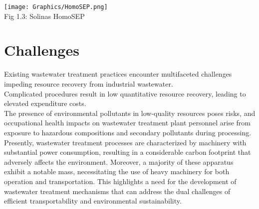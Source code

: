 \documentclass[a4,10pt]{report}
\begin{document}
\begin{center}
    \texttt{[image: Graphics/HomoSEP.png]} \\
    
    Fig 1.3: Solinas HomoSEP \\
\end{center}



\section{Challenges}
Existing wastewater treatment practices encounter multifaceted challenges impeding resource recovery from industrial wastewater. 
\vspace{2mm} \\
Complicated procedures result in low quantitative resource recovery, leading to elevated expenditure costs. \\ 

The presence of environmental pollutants in low-quality resources poses risks, and occupational health impacts on wastewater treatment plant personnel arise from exposure to hazardous compositions and secondary pollutants during processing. 
\vspace{2mm} \\
Presently, wastewater treatment processes are characterized by machinery with substantial power consumption, resulting in a considerable carbon footprint that adversely affects the environment. Moreover, a majority of these apparatus exhibit a notable mass, necessitating the use of heavy machinery for both operation and transportation. This highlights a need for the development of wastewater treatment mechanisms that can address the dual challenges of efficient transportability and environmental sustainability. \\
\end{document}
